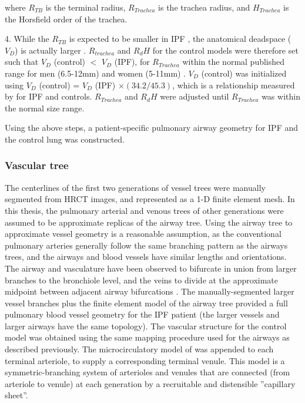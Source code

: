 \noindent where $R_{TB}$ is the terminal radius, $R_{Trachea}$ is the trachea radius, and $H_{Trachea}$ is the Horsfield order of the trachea.

4. While the $R_{TB}$ is expected to be smaller in IPF \citep{crystal1976idiopathic}, the anatomical deadspace ($V_D$) is actually larger \citep{plantier2016increased}. $R_{trachea}$ and $R_dH$ for the control models were therefore set such that $V_D$ (control) $<$ $V_D$ (IPF), for $R_{Trachea}$ within the normal published range for men (6.5-12mm) and women (5-11mm) \citep{breatnach1984dimensions}. $V_D$ (control) was initialized using $V_D$ (control) = $V_D$ (IPF) $\times (34.2/45.3)$, which is a relationship measured by \cite{plantier2016increased} for IPF and controls. $R_{Trachea}$ and $R_dH$ were adjusted until $R_{Trachea}$ was within the normal size range.

Using the above steps, a patient-specific pulmonary airway geometry for IPF and the control lung was constructed. 

\subsubsection{Vascular tree}
The centerlines of the first two generations of vessel trees were manually segmented from HRCT images, and represented as a 1-D finite element mesh. In this thesis, the pulmonary arterial and venous trees of other generations were assumed to be approximate replicas of the airway tree. Using the airway tree to approximate vessel geometry is a reasonable assumption, as the conventional pulmonary arteries generally follow the same branching pattern as the airways trees, and the airways and blood vessels have similar lengths and orientations. The airway and vasculature have been observed to bifurcate in union from larger branches to the bronchiole level, and the veins to divide at the approximate midpoint between adjacent airway bifurcations \citep{weibel1984pathway, hsia2016lung}. The manually-segmented larger vessel branches plus the finite element model of the airway tree provided a full pulmonary blood vessel geometry for the IPF patient (the larger vessels and larger airways have the same topology). The vascular structure for the control model was obtained using the same mapping procedure used for the airways as described previously. The microcirculatory model of \cite{clark2010contribution,clark2011interdependent} was appended to each terminal arteriole, to supply a corresponding terminal venule. This model is a symmetric-branching system of arterioles and venules that are connected (from arteriole to venule) at each generation by a recruitable and distensible ''capillary sheet''.

